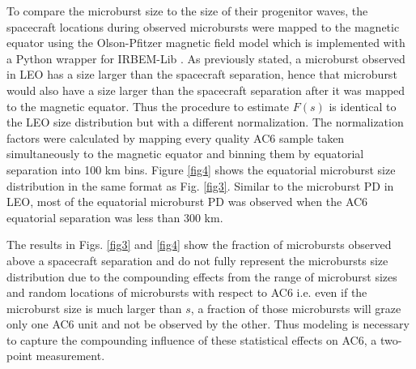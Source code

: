\documentclass[draft]{agujournal2019}
\begin{document}
To compare the microburst size to the size of their progenitor waves, the spacecraft locations during observed microbursts were mapped to the magnetic equator using the Olson-Pfitzer magnetic field model \cite{Olson1982} which is implemented with a Python wrapper for IRBEM-Lib \cite{irbem}. As previously stated, a microburst observed in LEO has a size larger than the spacecraft separation, hence that microburst would also have a size larger than the spacecraft separation after it was mapped to the magnetic equator. Thus the procedure to estimate $F(s)$ is identical to the LEO size distribution but with a different normalization. The normalization factors were calculated by mapping every quality AC6 sample taken simultaneously to the magnetic equator and binning them by equatorial separation into 100 km bins. Figure \ref{fig4} shows the equatorial microburst size distribution in the same format as Fig. \ref{fig3}. Similar to the microburst PD in LEO, most of the equatorial microburst PD was observed when the AC6 equatorial separation was less than 300 km. 

The results in Figs. \ref{fig3} and \ref{fig4} show the fraction of microbursts observed above a spacecraft separation and do not fully represent the microbursts size distribution due to the compounding effects from the range of microburst sizes and random locations of microbursts with respect to AC6 i.e. even if the microburst size is much larger than $s$, a fraction of those microbursts will graze only one AC6 unit and not be observed by the other. Thus modeling is necessary to capture the compounding influence of these statistical effects on AC6, a two-point measurement.
\end{document}
